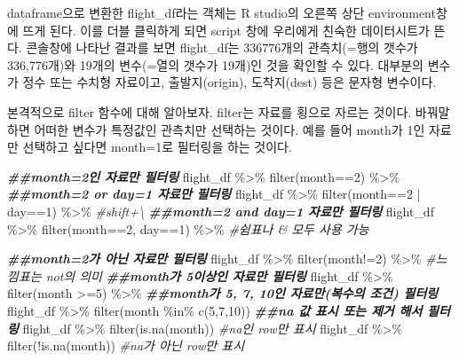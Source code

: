 \documentclass[
]{book}
\newenvironment{Shaded}{\begin{snugshade}}{\end{snugshade}}
\newcommand{\CommentTok}[1]{\textcolor[rgb]{0.56,0.35,0.01}{\textit{#1}}}
\newcommand{\DecValTok}[1]{\textcolor[rgb]{0.00,0.00,0.81}{#1}}
\newcommand{\DocumentationTok}[1]{\textcolor[rgb]{0.56,0.35,0.01}{\textbf{\textit{#1}}}}
\newcommand{\FunctionTok}[1]{\textcolor[rgb]{0.00,0.00,0.00}{#1}}
\newcommand{\NormalTok}[1]{#1}
\newcommand{\SpecialCharTok}[1]{\textcolor[rgb]{0.00,0.00,0.00}{#1}}
\theoremstyle{definition}
\theoremstyle{definition}
\theoremstyle{definition}
\theoremstyle{definition}
\theoremstyle{remark}
\begin{document}
dataframe으로 변환한 flight\_df라는 객체는 R studio의 오른쪽 상단 environment창에 뜨게 된다. 이를 더블 클릭하게 되면 script 창에 우리에게 친숙한 데이터시트가 뜬다. 콘솔창에 나타난 결과를 보면 flight\_df는 336776개의 관측치(=행의 갯수가 336,776개)와 19개의 변수(=열의 갯수가 19개)인 것을 확인할 수 있다. 대부분의 변수가 정수 또는 수치형 자료이고, 출발지(origin), 도착지(dest) 등은 문자형 변수이다.

본격적으로 filter 함수에 대해 알아보자. filter는 자료를 횡으로 자르는 것이다. 바꿔말하면 어떠한 변수가 특정값인 관측치만 선택하는 것이다. 예를 들어 month가 1인 자료만 선택하고 싶다면 month=1로 필터링을 하는 것이다.

\begin{Shaded}
\begin{Highlighting}[]
\DocumentationTok{\#\#month=2인 자료만 필터링}
\NormalTok{flight\_df }\SpecialCharTok{\%\textgreater{}\%} 
  \FunctionTok{filter}\NormalTok{(month}\SpecialCharTok{==}\DecValTok{2}\NormalTok{) }\SpecialCharTok{\%\textgreater{}\%}
\DocumentationTok{\#\#month=2 or day=1 자료만 필터링}
\NormalTok{flight\_df }\SpecialCharTok{\%\textgreater{}\%} 
  \FunctionTok{filter}\NormalTok{(month}\SpecialCharTok{==}\DecValTok{2} \SpecialCharTok{|}\NormalTok{ day}\SpecialCharTok{==}\DecValTok{1}\NormalTok{) }\SpecialCharTok{\%\textgreater{}\%}  \CommentTok{\#shift+\textbackslash{}}
\DocumentationTok{\#\#month=2 and day=1 자료만 필터링}
\NormalTok{flight\_df }\SpecialCharTok{\%\textgreater{}\%} 
  \FunctionTok{filter}\NormalTok{(month}\SpecialCharTok{==}\DecValTok{2}\NormalTok{, day}\SpecialCharTok{==}\DecValTok{1}\NormalTok{) }\SpecialCharTok{\%\textgreater{}\%}  \CommentTok{\#쉼표나 \& 모두 사용 가능}

\DocumentationTok{\#\#month=2가 아닌 자료만 필터링}
\NormalTok{flight\_df }\SpecialCharTok{\%\textgreater{}\%} 
  \FunctionTok{filter}\NormalTok{(month}\SpecialCharTok{!=}\DecValTok{2}\NormalTok{) }\SpecialCharTok{\%\textgreater{}\%}  \CommentTok{\#느낌표는 not의 의미}
\DocumentationTok{\#\#month가 5이상인 자료만 필터링}
\NormalTok{flight\_df }\SpecialCharTok{\%\textgreater{}\%} 
  \FunctionTok{filter}\NormalTok{(month }\SpecialCharTok{\textgreater{}=}\DecValTok{5}\NormalTok{) }\SpecialCharTok{\%\textgreater{}\%}  
\DocumentationTok{\#\#month가 5, 7, 10인 자료만(복수의 조건) 필터링}
\NormalTok{flight\_df }\SpecialCharTok{\%\textgreater{}\%} 
  \FunctionTok{filter}\NormalTok{(month }\SpecialCharTok{\%in\%} \FunctionTok{c}\NormalTok{(}\DecValTok{5}\NormalTok{,}\DecValTok{7}\NormalTok{,}\DecValTok{10}\NormalTok{))}
\DocumentationTok{\#\#na 값 표시 또는 제거 해서 필터링}
\NormalTok{flight\_df }\SpecialCharTok{\%\textgreater{}\%} 
  \FunctionTok{filter}\NormalTok{(}\FunctionTok{is.na}\NormalTok{(month)) }\CommentTok{\#na인 row만 표시}
\NormalTok{flight\_df }\SpecialCharTok{\%\textgreater{}\%} 
  \FunctionTok{filter}\NormalTok{(}\SpecialCharTok{!}\FunctionTok{is.na}\NormalTok{(month)) }\CommentTok{\#na가 아닌 row만 표시}
\end{Highlighting}
\end{Shaded}
\end{document}
